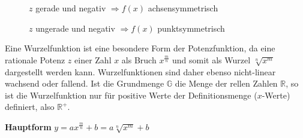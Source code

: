 \begin{figure}[h!]
\begin{floatrow}
{
		} {\caption*{$z$ gerade und negativ $\Rightarrow f(x)$ achsensymmetrisch}}

		\ffigbox
		{
		} {\caption*{$z$ ungerade und negativ $\Rightarrow f(x)$ punktsymmetrisch}}
	\end{floatrow}
\end{figure}

\pagebreak


Eine Wurzelfunktion ist eine besondere Form der Potenzfunktion, da eine rationale Potenz $z$ einer Zahl $x$ als Bruch $x^{\frac{m}{n}}$ und somit als Wurzel $\sqrt[n]{x^m}$ dargestellt werden kann. Wurzelfunktionen sind daher ebenso nicht-linear wachsend oder fallend. Ist die Grundmenge $\mathbb{G}$ die Menge der rellen Zahlen $\mathbb{R}$, so ist die Wurzelfunktion nur f\"{u}r positive Werte der Definitionsmenge ($x$-Werte) definiert, also $\mathbb{R^+}$.

\textbf{Hauptform}  $y = ax^{\frac{m}{n}} + b = a\sqrt[n]{x^m} + b$

